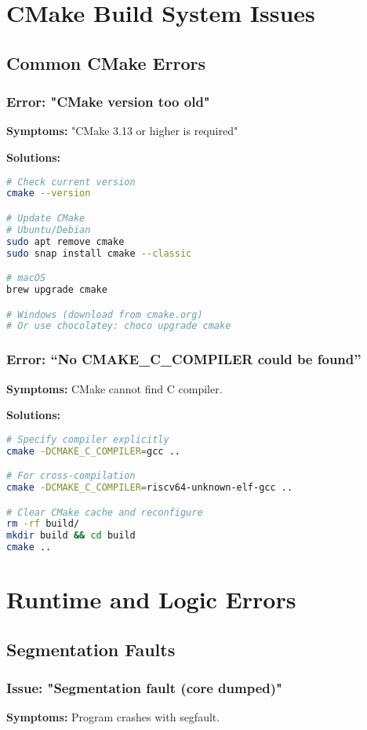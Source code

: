 \documentclass[11pt,a4paper]{article}
\begin{document}
\section{CMake Build System Issues}

\subsection{Common CMake Errors}

\subsubsection{Error: "CMake version too old"}
\textbf{Symptoms:} "CMake 3.13 or higher is required"

\textbf{Solutions:}
\begin{lstlisting}[language=bash]
# Check current version
cmake --version

# Update CMake
# Ubuntu/Debian
sudo apt remove cmake
sudo snap install cmake --classic

# macOS
brew upgrade cmake

# Windows (download from cmake.org)
# Or use chocolatey: choco upgrade cmake
\end{lstlisting}

\subsubsection{Error: ``No CMAKE\_C\_COMPILER could be found''}
\textbf{Symptoms:} CMake cannot find C compiler.

\textbf{Solutions:}
\begin{lstlisting}[language=bash]
# Specify compiler explicitly
cmake -DCMAKE_C_COMPILER=gcc ..

# For cross-compilation
cmake -DCMAKE_C_COMPILER=riscv64-unknown-elf-gcc ..

# Clear CMake cache and reconfigure
rm -rf build/
mkdir build && cd build
cmake ..
\end{lstlisting}

\section{Runtime and Logic Errors}

\subsection{Segmentation Faults}

\subsubsection{Issue: "Segmentation fault (core dumped)"}
\textbf{Symptoms:} Program crashes with segfault.
\end{document}
